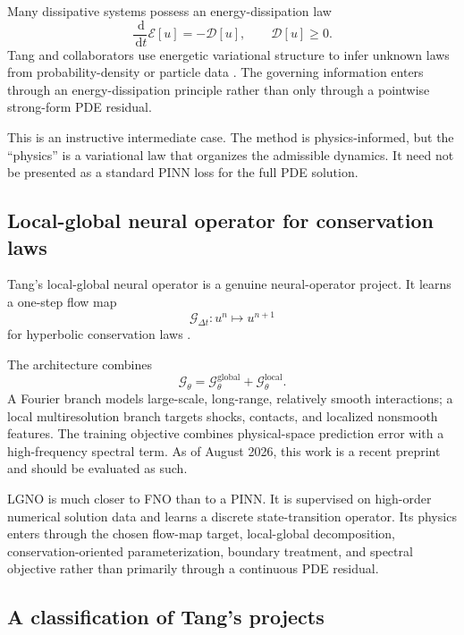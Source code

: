 \documentclass[11pt]{article}
\newcommand{\G}{\mathcal{G}}
\newcommand{\dd}{\,\mathrm{d}}
\begin{document}
Many dissipative systems possess an energy-dissipation law
\begin{equation}
 \frac{\dd}{\dd t}\mathcal{E}[u]
 =-\mathcal{D}[u],
 \qquad
 \mathcal{D}[u]\ge0.
\end{equation}
Tang and collaborators use energetic variational structure to infer unknown laws from probability-density or particle data \citep{lu2026energetic}. The governing information enters through an energy-dissipation principle rather than only through a pointwise strong-form PDE residual.

This is an instructive intermediate case. The method is physics-informed, but the ``physics'' is a variational law that organizes the admissible dynamics. It need not be presented as a standard PINN loss for the full PDE solution.

\subsection{Local-global neural operator for conservation laws}

Tang's local-global neural operator is a genuine neural-operator project. It learns a one-step flow map
\begin{equation}
 \G_{\Delta t}:u^n\longmapsto u^{n+1}
\end{equation}
for hyperbolic conservation laws \citep{wang2026lgno}.

The architecture combines
\[
 \G_\theta
 =\G_\theta^{\mathrm{global}}
 +\G_\theta^{\mathrm{local}}.
\]
A Fourier branch models large-scale, long-range, relatively smooth interactions; a local multiresolution branch targets shocks, contacts, and localized nonsmooth features. The training objective combines physical-space prediction error with a high-frequency spectral term. As of August 2026, this work is a recent preprint and should be evaluated as such.

LGNO is much closer to FNO than to a PINN. It is supervised on high-order numerical solution data and learns a discrete state-transition operator. Its physics enters through the chosen flow-map target, local-global decomposition, conservation-oriented parameterization, boundary treatment, and spectral objective rather than primarily through a continuous PDE residual.

\subsection{A classification of Tang's projects}
\end{document}
